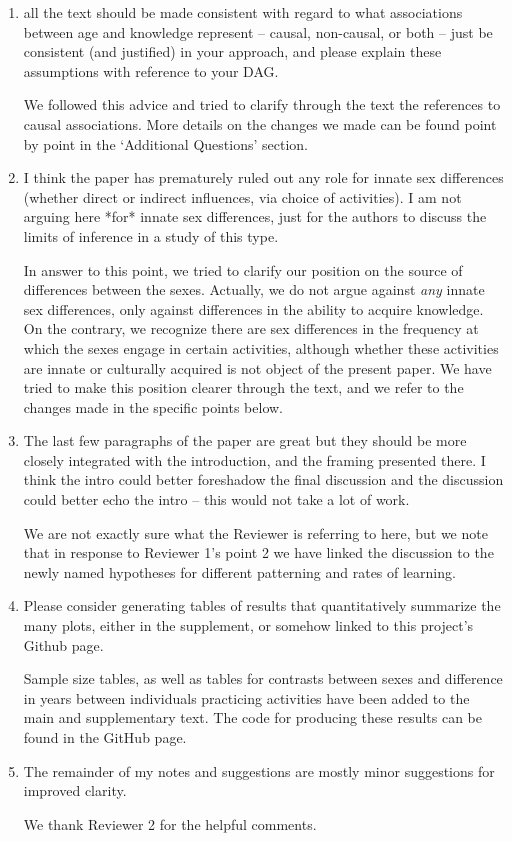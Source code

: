\documentclass{article}
\newcommand{\rev}[1]{{\color{Red}#1}}
\newcommand{\comment}[1]{{\color{Blue}#1}}
\begin{document}
\begin{enumerate}
    \item all the text should be made consistent with regard to what associations between age and knowledge represent -- causal, non-causal, or both -- just be consistent (and justified) in your approach, and please explain these assumptions with reference to your DAG. 
    
    \comment{We followed this advice and tried to clarify through the text the references to causal associations. More details on the changes we made can be found point by point in the `Additional Questions' section.}
    
    \item  I think the paper has prematurely ruled out any role for innate sex differences (whether direct or indirect influences, via choice of activities). I am not arguing here *for* innate sex differences, just for the authors to discuss the limits of inference in a study of this type. 
    
    \comment{In answer to this point, we tried to clarify our position on the source of differences between the sexes. Actually, we do not argue against \textit{any} innate sex differences, only against differences in the ability to acquire knowledge. On the contrary, we recognize there are sex differences in the frequency at which the sexes engage in certain activities, although whether these activities are innate or culturally acquired is not object of the present paper. We have tried to make this position clearer through the text, and we refer to the changes made in the specific points below.}
    
    \item  The last few paragraphs of the paper are great but they should be more closely integrated with the introduction, and the framing presented there. I think the intro could better foreshadow the final discussion and the discussion could better echo the intro -- this would not take a lot of work. 
    
    \rev{We are not exactly sure what the Reviewer is referring to here, but we note that in response to Reviewer 1's point 2 we have linked the discussion to the newly named hypotheses for different patterning and rates of learning.}
    
    \item  Please consider generating tables of results that quantitatively summarize the many plots, either in the supplement, or somehow linked to this project's Github page. 
    
    \comment{Sample size tables, as well as tables for contrasts between sexes and difference in years between individuals practicing activities have been added to the main and supplementary text. The code for producing these results can be found in the GitHub page. }
    
    \item  The remainder of my notes and suggestions are mostly minor suggestions for improved clarity. 
    
    \comment{We thank Reviewer 2 for the helpful comments.}
\end{enumerate}
\end{document}
